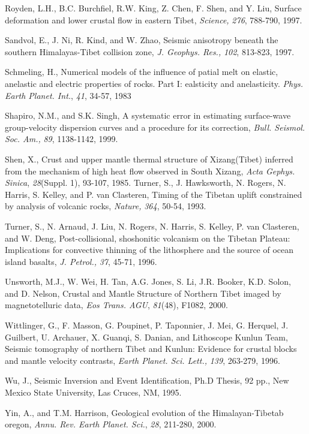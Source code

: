 \documentclass[12pt]{article}
\begin{document}
\begin{references}
Royden, L.H., B.C. Burchfiel, R.W. King, Z. Chen, F. Shen, and Y. Liu,
Surface deformation and lower crustal flow in eastern Tibet, {\it Science,}
{\it 276}, 788-790, 1997.

Sandvol, E., J. Ni, R. Kind, and W. Zhao, Seismic anisotropy
beneath the southern Himalayas-Tibet collision zone, {\it J. Geophys. Res.,}
{\it 102}, 813-823, 1997.

Schmeling, H., Numerical models of the influence of patial melt on
elastic, anelastic and electric properties of rocks. Part I:
ealsticity and anelasticity. {\it Phys. Earth Planet. Int.}, {\it 41},
34-57, 1983

Shapiro, N.M., and S.K. Singh, A systematic error in estimating
surface-wave group-velocity dispersion curves and a procedure for its
correction, {\it Bull. Seismol. Soc. Am.,} {\it 89}, 1138-1142, 1999.

Shen, X., Crust and upper mantle thermal structure of Xizang(Tibet)
inferred from the mechanism of high heat flow observed in South
Xizang, {\it Acta Gephys. Sinica}, {\it 28}(Suppl. 1), 93-107, 1985.
Turner, S., J. Hawksworth, N. Rogers, N. Harris, S. Kelley, and P. van
Clasteren, Timing of the Tibetan uplift constrained
by analysis of volcanic rocks, {\it Nature,} {\it 364}, 50-54, 1993.

Turner, S., N. Arnaud, J. Liu, N. Rogers, N. Harris, S. Kelley, P. van
Clasteren, and W. Deng, Post-collisional, shoshonitic volcanism
on the Tibetan Plateau: Implications for convective thinning of the
lithosphere and the source of ocean island basalts, {\it J. Petrol.,}
{\it 37}, 45-71, 1996.

Unsworth, M.J., W. Wei, H. Tan, A.G. Jones, S. Li, J.R. Booker, K.D. Solon,
and D. Nelson, Crustal and Mantle Structure of Northern Tibet imaged by
magnetotelluric data, {\it Eos Trans. AGU}, {\it 81}(48), F1082, 2000.

Wittlinger, G., F. Masson, G. Poupinet, P. Taponnier, J. Mei, G. Herquel,
J. Guilbert, U. Archauer, X. Guanqi, S. Danian, and Lithoscope Kunlun Team,
Seismic tomography of northern Tibet and Kunlun: Evidence for crustal blocks
and mantle velocity contrasts, {\it Earth Planet. Sci. Lett.,} {\it 139},
263-279, 1996.

Wu, J., Seismic Inversion and Event Identification, Ph.D Thesis, 92 pp.,
New Mexico State University, Las Cruces, NM, 1995.

Yin, A., and T.M. Harrison, Geological evolution of the
Himalayan-Tibetab oregon, {\it Annu. Rev. Earth Planet. Sci.}, {\it 28}, 211-280,
2000.


\end{references}
\end{document}

